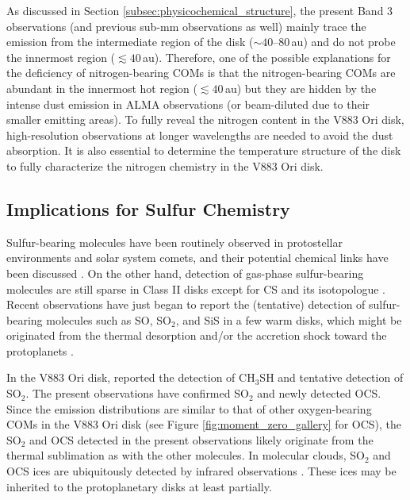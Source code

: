 \documentclass[linenumbers, twocolumn, twocolappendix, astrosymb, times]{aastex631}
\begin{document}
As discussed in Section \ref{subsec:physicochemical_structure}, the present Band 3 observations (and previous sub-mm observations as well) mainly trace the emission from the intermediate region of the disk ($\sim40$--80\,au) and do not probe the innermost region ($\lesssim40$\,au). Therefore, one of the possible explanations for the deficiency of nitrogen-bearing COMs is that the nitrogen-bearing COMs are abundant in the innermost hot region ($\lesssim40$\,au) but they are hidden by the intense dust emission in ALMA observations (or beam-diluted due to their smaller emitting areas). To fully reveal the nitrogen content in the V883 Ori disk, high-resolution observations at longer wavelengths are needed to avoid the dust absorption. It is also essential to determine the temperature structure of the disk to fully characterize the nitrogen chemistry in the V883 Ori disk.

\subsection{Implications for Sulfur Chemistry}
Sulfur-bearing molecules have been routinely observed in protostellar environments and solar system comets, and their potential chemical links have been discussed \citep[e.g.,][]{Drozdovskaya2018}. On the other hand, detection of gas-phase sulfur-bearing molecules are still sparse in Class II disks except for CS and its isotopologue \citep[][and references therein]{LeGal2021}. Recent observations have just began to report the (tentative) detection of sulfur-bearing molecules such as SO, SO$_2$, and SiS in a few warm disks, which might be originated from the thermal desorption and/or the accretion shock toward the protoplanets \citep{Booth2021, Booth2023, Law2023_SiS}. 

In the V883 Ori disk, \citet{Lee2019} reported the detection of CH$_3$SH and tentative detection of SO$_2$. The present observations have confirmed SO$_2$ and newly detected OCS.
Since the emission distributions are similar to that of other oxygen-bearing COMs in the V883 Ori disk (see Figure \ref{fig:moment_zero_gallery} for OCS), the SO$_2$ and OCS detected in the present observations likely originate from the thermal sublimation as with the other molecules. In molecular clouds, SO$_2$ and OCS ices are ubiquitously detected by infrared observations \citep[][and references therein]{Boogert2015}. These ices may be inherited to the protoplanetary disks at least partially.
\end{document}
